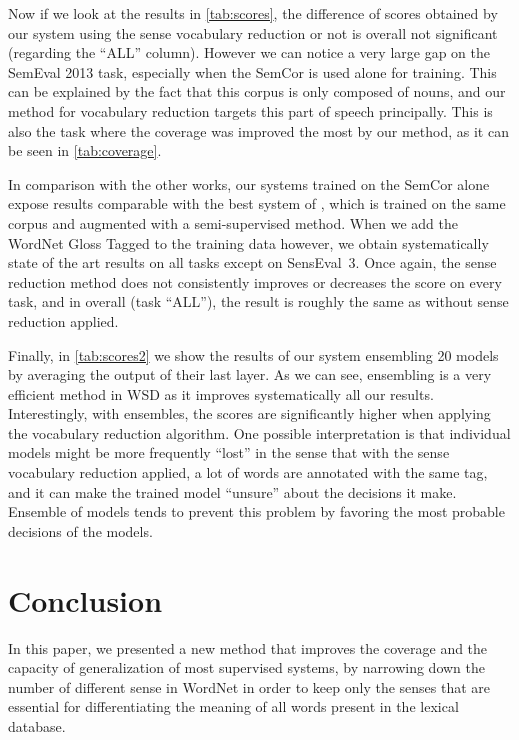 \documentclass[11pt,a4paper]{article}
\begin{document}
Now if we look at the results in \autoref{tab:scores}, the difference of scores obtained by our system using the sense vocabulary reduction or not is overall not significant (regarding the ``ALL'' column). However we can notice a very large gap on the SemEval 2013 task, especially when the SemCor is used alone for training. This can be explained by the fact that this corpus is only composed of nouns, and our method for vocabulary reduction targets this part of speech principally. This is also the task where the coverage was improved the most by our method, as it can be seen in \autoref{tab:coverage}.   

In comparison with the other works, our systems trained on the SemCor alone expose results comparable with the best system of \citet{yuan_2016}, which is trained on the same corpus and augmented with a semi-supervised method. When we add the WordNet Gloss Tagged to the training data however, we obtain systematically state of the art results on all tasks except on SensEval~3. Once again, the sense reduction method does not consistently improves or decreases the score on every task, and in overall (task ``ALL''), the result is roughly the same as without sense reduction applied.

Finally, in \autoref{tab:scores2} we show the results of our system ensembling 20 models by averaging the output of their last layer. As we can see, ensembling is a very efficient method in WSD as it improves systematically all our results. Interestingly, with ensembles, the scores are significantly higher when applying the vocabulary reduction algorithm. One possible interpretation is that individual models might be more frequently ``lost'' in the sense that with the sense vocabulary reduction applied, a lot of words are annotated with the same tag, and it can make the trained model ``unsure'' about the decisions it make. Ensemble of models tends to prevent this problem by favoring the most probable decisions of the models. 

\section{Conclusion}

In this paper, we presented a new method that improves the coverage and the capacity of generalization of most supervised systems, by narrowing down the number of different sense in WordNet in order to keep only the senses that are essential for differentiating the meaning of all words present in the lexical database.
\end{document}
